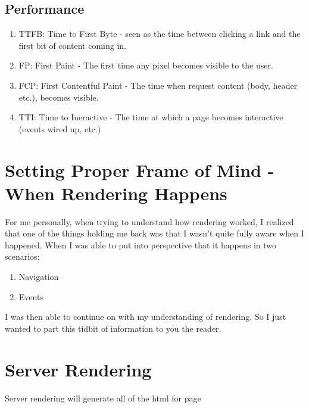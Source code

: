 \subsection{Performance}
\begin{enumerate}
  \item TTFB: Time to First Byte - seen as the time between clicking a link and the first bit of content coming in.
  \item FP: First Paint - The first time any pixel becomes visible to the user.
  \item FCP: First Contentful Paint - The time when request content (body, header etc.), becomes visible. 
  \item TTI: Time to Ineractive - The time at which a page becomes interactive (events wired up, etc.)
\end{enumerate}

\section{ Setting Proper Frame of Mind - When Rendering Happens }
For me personally, when trying to understand how rendering worked, I realized that one of the things holding me back was that I wasn't quite fully aware when I happened. When I was able to put into perspective that it happens in two scenarios: 
\begin{enumerate}
  \item Navigation 
  \item Events
\end{enumerate}

I was then able to continue on with my understanding of rendering. So I just wanted to part this tidbit of information to you the reader.

\section{Server Rendering}
Server rendering will generate all of the html for page 
